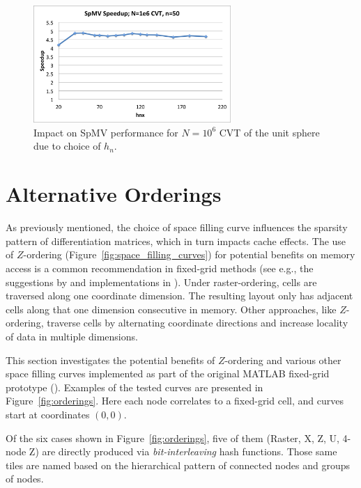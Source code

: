 \documentclass{report}
\begin{document}
\begin{figure}
\centering
\includegraphics[width=7.5cm]{../figures/stencils/cvt1m_spmv_speedup.png} 
\caption{Impact on SpMV performance for $N=10^6$ CVT of the unit sphere due to choice of $h_n$.}
\label{fig:spmv_vs_hn}
\end{figure}


\section{Alternative Orderings}

As previously mentioned, the choice of space filling curve influences the sparsity pattern of differentiation matrices, which in turn impacts cache effects. The use of $Z$-ordering (Figure~\ref{fig:space_filling_curves}) for potential benefits on memory access is a common recommendation in fixed-grid methods (see e.g., the suggestions by \cite{Johnson2011,Green2010,Krog2010} and implementations in \cite{Goswami2010, MellorCrummey2001}). Under raster-ordering, cells are traversed along one coordinate dimension. The resulting layout only has adjacent cells along that one dimension consecutive in memory. Other approaches, like $Z$-ordering, traverse cells by alternating coordinate directions and increase locality of data in multiple dimensions. 

This section investigates the potential benefits of $Z$-ordering and various other space filling curves implemented as part of the original MATLAB fixed-grid prototype (\cite{BolligRBFFixedGrid}). Examples of the tested curves are presented in Figure~\ref{fig:orderings}. Here each node correlates to a fixed-grid cell, and curves start at coordinates $(0,0)$. 

Of the six cases shown in Figure~\ref{fig:orderings}, five of them (Raster, X, Z, U, 4-node Z) are directly produced via \emph{bit-interleaving} hash functions. Those same tiles are named based on the hierarchical pattern of connected nodes and groups of nodes. 
\end{document}
